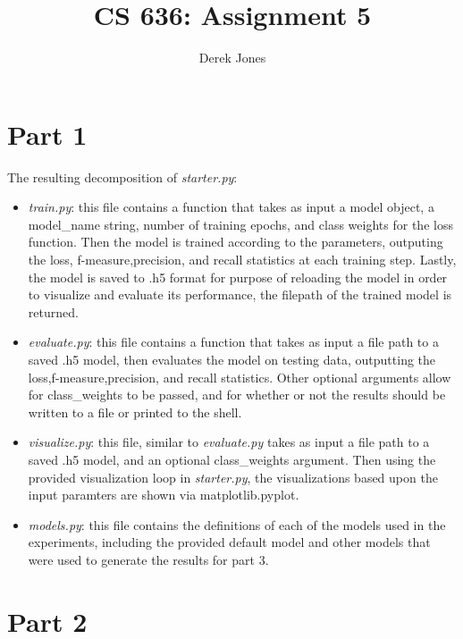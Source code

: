 \documentclass{article}
\author{Derek Jones}
\title{CS 636: Assignment 5}
\begin{document}
\maketitle



\section*{Part 1}

The resulting decomposition of \emph{starter.py}:
\begin{itemize}
	\item \emph{train.py}: this file contains a function that takes as input a model object, a model\_name string, number of training epochs, and class weights for the loss function. Then the model is trained according to the parameters, outputing the loss, f-measure,precision, and recall statistics at each training step. Lastly, the model is saved to .h5 format for purpose of reloading the model in order to visualize and evaluate its performance, the filepath of the trained model is returned.
	\item \emph{evaluate.py}: this file contains a function that takes as input a file path to a saved .h5 model, then evaluates the model on testing data, outputting the loss,f-measure,precision, and recall statistics. Other optional arguments allow for class\_weights to be passed, and for whether or not the results should be written to a file or printed to the shell. 
	\item \emph{visualize.py}: this file, similar to \emph{evaluate.py} takes as input a file path to a saved .h5 model, and an optional class\_weights argument. Then using the provided visualization loop in \emph{starter.py}, the visualizations based upon the input paramters are shown via matplotlib.pyplot.  
	\item \emph{models.py}: this file contains the definitions of each of the models used in the experiments, including the provided default model and other models that were used to generate the results for part 3.

\end{itemize}


\section*{Part 2}
\end{document}

